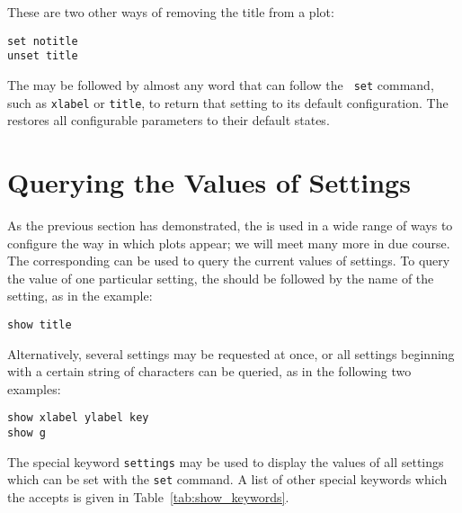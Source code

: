 \noindent These are two other ways of removing the title from a plot:

\begin{verbatim}
set notitle
unset title
\end{verbatim}

The  may be followed by almost any word that can follow the {\tt
set} command, such as {\tt xlabel} or {\tt title}, to return that setting to
its default configuration. The  restores all configurable
parameters to their default states.

\section{Querying the Values of Settings}

As the previous section has demonstrated, the  is used in a wide
range of ways to configure the way in which plots appear; we will meet many
more in due course. The corresponding  can be used to query the
current values of settings. To query the value of one particular setting, the
 should be followed by the name of the setting, as in the
example:

\begin{verbatim}
show title
\end{verbatim}

\noindent Alternatively, several settings may be requested at once, or all
settings beginning with a certain string of characters can be queried, as in
the following two examples:

\begin{verbatim}
show xlabel ylabel key
show g
\end{verbatim}

\noindent The special keyword {\tt settings} may be used to display the values
of all settings which can be set with the {\tt set} command. A list of other
special keywords which the  accepts is given in
Table~\ref{tab:show_keywords}.

